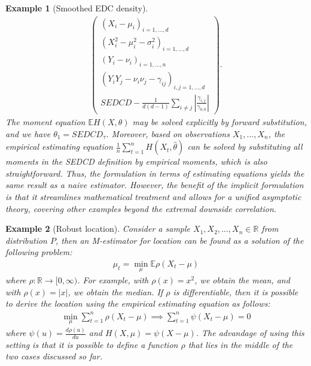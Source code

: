 \documentclass[10pt, a4paper]{article}
\theoremstyle{assumption}
\newtheorem{example}{Example}[section]
\theoremstyle{definition}
\theoremstyle{theorem}
\newcommand{\E}{\mathbb{E}}
\begin{document}
\begin{example}[Smoothed EDC density]
\begin{align*}
\begin{pmatrix}
            (X_i-\mu_i)_{i=1,\ldots, d}\\
            (X_i^2-\mu_i^2-\sigma_i^2)_{i=1,\ldots, d} \\
            (Y_i-\nu_i)_{i=1,\ldots, n}\\
            (Y_iY_j-\nu_i\nu_j-\gamma_{ij})_{i,j=1,\ldots, d}\\
            SEDCD - \frac{1}{d(d-1)} \sum_{i\neq j} |\frac{\gamma_{i,j}}{\gamma_{0,0}}|
        \end{pmatrix}.
    \end{align*}
    The moment equation $\E H(X,\theta)$ may be solved explicitly by forward substitution, and we have $\theta_{1}=SEDCD_\tau$. Moreover, based on observations $X_1,\ldots, X_n$, the empirical estimating equation $\frac{1}{n}\sum_{t=1}^n H(X_t,\widehat{\theta})$ can be solved by substituting all moments in the SEDCD definition by empirical moments, which is also straightforward. 
    Thus, the formulation in terms of estimating equations yields the same result as a naive estimator.
    However, the benefit of the implicit formulation is that it streamlines mathematical treatment and allows for a unified asymptotic theory, covering other examples beyond the extremal downside correlation.
\end{example}

\begin{example}[Robust location]\label{ex:robust-location} 
    Consider  a sample $X_1, X_2, \ldots,X_n \in \mathbb{R}$ from distribution $P$, then an M-estimator for location can be found as a solution of the following problem:
    \begin{align*}
        \mu_t = \min_\mu \E\rho(X_t-\mu)
    \end{align*}
    where $\rho : \mathbb{R} \to [0,\infty)$. For example, with $\rho(x)=x^2$, we obtain the mean, and with $\rho(x)=|x|$, we obtain the median. If $\rho$ is differentiable, then it is possible to derive the location using the empirical estimating equation as follows: \begin{align*}
    \min_{\mu} \sum_{t=1}^{n} \rho(X_t - \mu) \implies \sum_{t=1}^{n} \psi(X_t - \mu) = 0 \end{align*}
    where  $\psi(u) = \frac{d\rho(u)}{du}$ and $H(X,\mu) =\psi(X - \mu)$. 
     The advandage of using this setting is that it is possible to define a function $\rho$ that lies in the middle of the two cases discussed so far.
\end{example}
\end{document}
